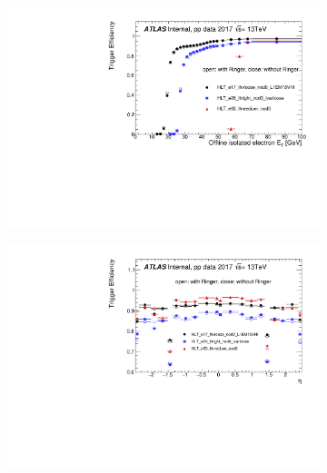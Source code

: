\begin{figure}[h!tb]
  \begin{center}
  \begin{subfigure}[c]{.48\textwidth}
  \centering
  \includegraphics[width=\textwidth]{sections/operation/figures/efficiencies/eff_EGAM1_e17_e26_e60_2017_before_and_after_ts1_et.pdf}
  \caption{}%
  \end{subfigure}
  \hfill
  \begin{subfigure}[c]{.48\textwidth}
  \centering
  \includegraphics[width=\textwidth]{sections/operation/figures/efficiencies/eff_EGAM1_e17_e26_e60_2017_before_and_after_ts1_eta.pdf}
  \caption{}%
  \end{subfigure} \\
  \begin{subfigure}[c]{.48\textwidth}

\end{subfigure}
\end{center}
\end{figure}
